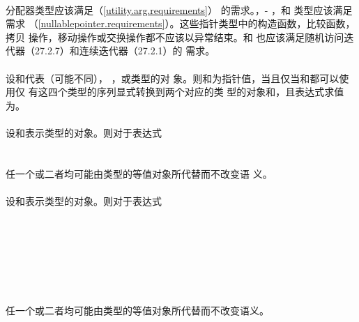 \paragraph{}
分配器类型应该满足（\ref{utility.arg.requirements}）
的需求。，- ，和
类型应该满足需求
（\ref{nullablepointer.requirements}）。这些指针类型中的构造函数，比较函数，拷贝
操作，移动操作或交换操作都不应该以异常结束。和
也应该满足随机访问迭代器（27.2.7）和连续迭代器（27.2.1）的
需求。

\paragraph{}
设和代表（可能不同），
，或类型的对
象。则和为指针值，当且仅当和都可以使用仅
有这四个类型的序列显式转换到两个对应的类
型的对象和，且表达式求值为。

\paragraph{}
设和表示类型的对象。则对于表达式           \\
\mbox{}                                                  \\
\mbox{}                                                  \\
任一个或二者均可能由类型的等值对象所代替而不改变语
义。

\paragraph{}
设和表示类型的对象。则对于表达式                 \\
\mbox{}                                                  \\
\mbox{}                                                  \\
\mbox{}                                                 \\
\mbox{}                                                  \\
\mbox{}                                                  \\
\mbox{}                                                 \\
\mbox{}                                                 \\
任一个或二者均可能由类型的等值对象所代替而不改变语义。


